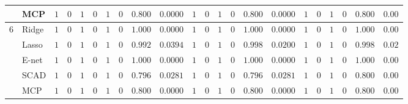\begin{tabular}{ll|ll|llllll|llllll|llllll}
 & MCP  & $1$ & $0$ & $1$ & $0$ & $1$ & $0$ & $0.800$ & $0.0000$ & $1$ & $0$ & $1$ & $0$ & $0.800$ & $0.0000$ & $1$ & $0$ & $1$ & $0$ & $0.800$ & $0.00$ \\\hline
6 & Ridge  & $1$ & $0$ & $1$ & $0$ & $1$ & $0$ & $1.000$ & $0.0000$ & $1$ & $0$ & $1$ & $0$ & $1.000$ & $0.0000$ & $1$ & $0$ & $1$ & $0$ & $1.000$ & $0.00$ \\
 & Lasso  & $1$ & $0$ & $1$ & $0$ & $1$ & $0$ & $0.992$ & $0.0394$ & $1$ & $0$ & $1$ & $0$ & $0.998$ & $0.0200$ & $1$ & $0$ & $1$ & $0$ & $0.998$ & $0.02$ \\
 & E-net  & $1$ & $0$ & $1$ & $0$ & $1$ & $0$ & $1.000$ & $0.0000$ & $1$ & $0$ & $1$ & $0$ & $1.000$ & $0.0000$ & $1$ & $0$ & $1$ & $0$ & $1.000$ & $0.00$ \\
 & SCAD  & $1$ & $0$ & $1$ & $0$ & $1$ & $0$ & $0.796$ & $0.0281$ & $1$ & $0$ & $1$ & $0$ & $0.796$ & $0.0281$ & $1$ & $0$ & $1$ & $0$ & $0.800$ & $0.00$ \\
 & MCP  & $1$ & $0$ & $1$ & $0$ & $1$ & $0$ & $0.800$ & $0.0000$ & $1$ & $0$ & $1$ & $0$ & $0.800$ & $0.0000$ & $1$ & $0$ & $1$ & $0$ & $0.800$ & $0.00$ \\
\hline 
\end{tabular}

